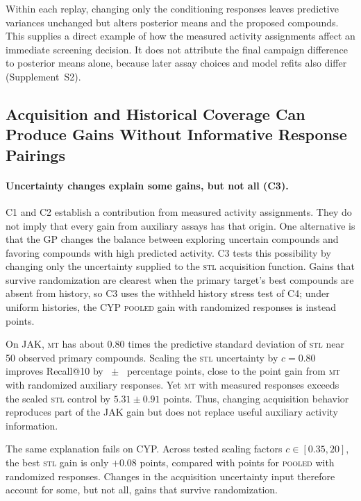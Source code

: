 \documentclass[10pt,letterpaper,runningheads]{llncs}
\newcommand{\stl}{\textsc{stl}}
\newcommand{\mt}{\textsc{mt}}
\newcommand{\pooled}{\textsc{pooled}}
\begin{document}
Within each replay, changing only the conditioning responses leaves
predictive variances unchanged but alters posterior means and the
proposed compounds. This supplies a direct example of how the measured
activity assignments affect an immediate screening decision. It does
not attribute the final campaign difference to posterior means alone,
because later assay choices and model refits also differ
(Supplement~S2).

\subsection{Acquisition and Historical Coverage Can Produce Gains Without Informative Response Pairings}
\label{sec:res-exploration}

\paragraph{Uncertainty changes explain some gains, but not all (C3).}
C1 and C2 establish a contribution from measured activity assignments.
They do not imply that every gain from auxiliary assays has that
origin. One alternative is that the GP changes the balance between
exploring uncertain compounds and favoring compounds with high
predicted activity. C3 tests this possibility by changing only the
uncertainty supplied to the \stl{} acquisition function. Gains that
survive randomization are clearest when the primary target's best
compounds are absent from history, so C3 uses the withheld history
stress test of C4; under uniform histories, the CYP \pooled{} gain with
randomized responses is instead \pooledRecallUniformFifty{} points.

On JAK, \mt{} has about $0.80$ times the predictive standard deviation
of \stl{} near 50 observed primary compounds. Scaling the \stl{}
uncertainty by $c=0.80$ improves Recall@10 by
\valScaleMatchedJak{}~$\pm$~\semScaleMatchedJak{} percentage points,
close to the \valMechJakMt{} point gain from \mt{} with randomized
auxiliary responses. Yet \mt{} with measured responses exceeds the
scaled \stl{} control by $5.31\pm0.91$ points. Thus, changing
acquisition behavior reproduces part of the JAK gain but does not
replace useful auxiliary activity information.

The same explanation fails on CYP. Across tested scaling factors
$c\in[0.35,20]$, the best \stl{} gain is only $+0.08$ points,
compared with \valMechCypPooled{} points for \pooled{} with
randomized responses. Changes in the acquisition uncertainty input
therefore account for some, but not all, gains that survive
randomization.
\end{document}
